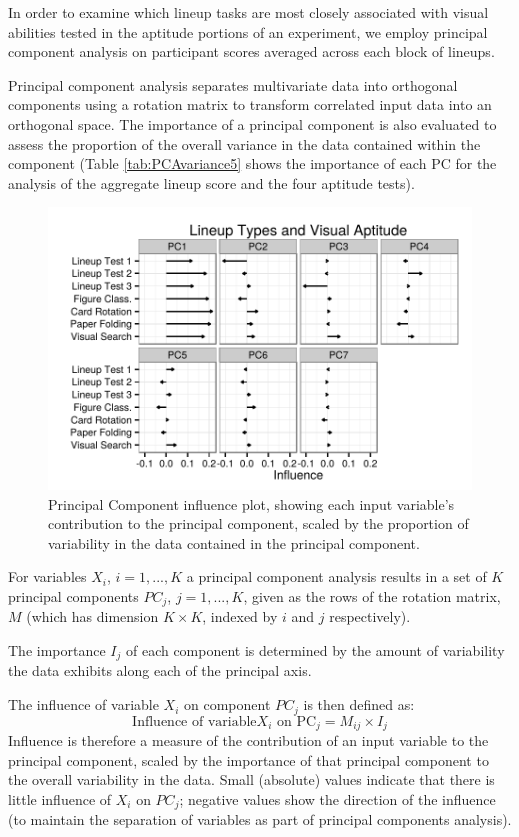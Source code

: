 \documentclass[11pt]{isuthesis}\usepackage[]{graphicx}\usepackage[]{color}
\begin{document}
In order to examine which lineup tasks are most closely associated with visual abilities tested in the aptitude portions of an experiment, we employ principal component analysis on participant scores averaged across each block of lineups.

Principal component analysis separates multivariate data into orthogonal components using a rotation matrix to transform correlated input data into an orthogonal space. The importance of a principal component is also evaluated to assess the proportion of the overall variance in the data contained within the component (Table \ref{tab:PCAvariance5} shows the importance of each PC for the analysis of the aggregate lineup score and the four aptitude tests). 


\begin{figure}[ht]\centering
\includegraphics[width=.5\linewidth]{fig-lineupblockpca-1}
\caption[Principal component influence]{Principal Component influence plot, showing each input variable's contribution to the principal component, scaled by the proportion of variability in the data contained in the principal component.\label{fig:influence}}
\end{figure}

For variables $X_i$, $i=1, ..., K$ a principal component analysis results in a set of $K$ principal  components $PC_j$, $j=1, ..., K$, given as the rows of the rotation matrix, $M$ (which has dimension $K\times K$, indexed by $i$ and $j$ respectively).

The importance $I_j$ of each component is determined by the amount of variability the data exhibits along each of the principal axis.

The influence of variable $X_i$ on component $PC_j$ is then defined as:
%
$$\text{Influence of variable} X_i \text{ on PC}_j = M_{ij}\times I_j$$
%
Influence is therefore a measure of the contribution of an input variable to the principal component, scaled by the importance of that principal component to the overall variability in the data. Small (absolute) values indicate that there is little influence of $X_i$ on $PC_j$; negative values show the direction of the influence (to maintain the separation of variables as part of principal components analysis). 
\end{document}
